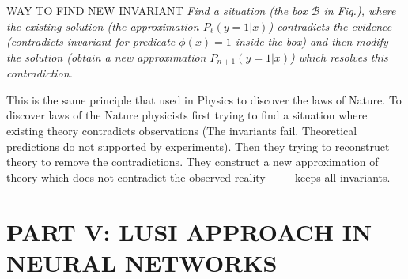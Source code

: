 \documentclass[11pt]{beamer}
\begin{document}
\begin{frame}{WAY TO FIND NEW INVARIANT}
\emph{Find a situation (the box $\mathcal{B}$ in Fig.), where the existing solution (the approximation $P_{\ell}(y=1|x)$) contradicts the evidence (contradicts invariant for predicate $\phi(x) = 1$ inside the box) and then modify the solution (obtain a new approximation $P_{n+1}(y=1|x)$) which resolves this contradiction.}

\hrulefill

This is the same principle  that used in Physics to discover the laws of Nature. To discover laws of the Nature physicists first trying to find a situation where existing theory contradicts observations (The invariants fail. Theoretical predictions do not supported by experiments). Then they trying to reconstruct theory to remove the contradictions. They construct a new approximation of theory which does not contradict the observed reality —— keeps all invariants.

\hrulefill

\end{frame}

\section{PART V: LUSI APPROACH IN NEURAL NETWORKS}
\begin{frame}
{\color{blue}{
\begin{center}
PART V
\end{center}
\begin{center}
LUSI APPROACH IN NEURAL NETWORKS
\end{center}
}}
\end{frame}
\end{document}
